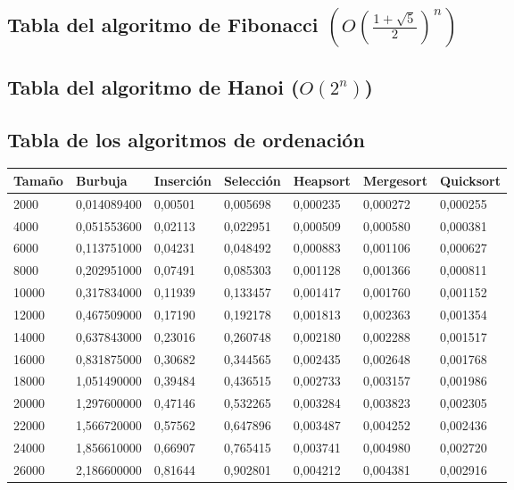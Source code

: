 \documentclass[a4paper, 11pt]{article}
\begin{document}
\subsection{Tabla del algoritmo de Fibonacci $(O(\frac{1+\sqrt{5}}{2})^n)$}
   

\subsection{Tabla del algoritmo de Hanoi ($O(2^n)$)}
   

\subsection{Tabla de los algoritmos de ordenación}

\begin{tabular}{|l|l|l|l|l|l|l|}
	\hline
	Tamaño	&Burbuja&	Inserción&	Selección&	Heapsort&	Mergesort&	Quicksort\\
	\hline
	\hline
	2000&	0,014089400&	0,00501	&0,005698&	0,000235&	0,000272&	0,000255\\
	\hline
	4000&	0,051553600&	0,02113	&0,022951&	0,000509&	0,000580&	0,000381\\
	\hline
	6000&	0,113751000&	0,04231&	0,048492&	0,000883&	0,001106&	0,000627\\
	\hline
	8000&	0,202951000&	0,07491&	0,085303&	0,001128&	0,001366&	0,000811\\
	\hline
	10000&	0,317834000&	0,11939&	0,133457&	0,001417&	0,001760&	0,001152\\
	\hline
	12000&	0,467509000&	0,17190&	0,192178&	0,001813&	0,002363&	0,001354\\
	\hline
	14000&	0,637843000&	0,23016&	0,260748&	0,002180&	0,002288&	0,001517\\
	\hline
	16000&	0,831875000&	0,30682&	0,344565&	0,002435&	0,002648&	0,001768\\
	\hline
	18000&	1,051490000&	0,39484&	0,436515&	0,002733&	0,003157&	0,001986\\
	\hline
	20000&	1,297600000&	0,47146&	0,532265&	0,003284&	0,003823&	0,002305\\
	\hline
	22000&	1,566720000&	0,57562&	0,647896&	0,003487&	0,004252&	0,002436\\
	\hline
	24000&	1,856610000&	0,66907&	0,765415&	0,003741&	0,004980&	0,002720\\
	\hline
	26000&	2,186600000&	0,81644&	0,902801&	0,004212&	0,004381&	0,002916\\
	\hline

\end{tabular}
\end{document}
